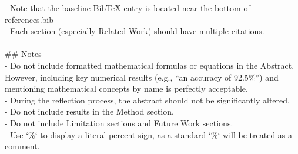\begin{tcolorbox}[colback=gray!10, colframe=gray!40!black, breakable=true, title=CLAUDE.md for the writing agent]
- Note that the baseline BibTeX entry is located near the bottom of references.bib\\
- Each section (especially Related Work) should have multiple citations.\\
\\
\#\# Notes\\
- Do not include formatted mathematical formulas or equations in the Abstract. However, including key numerical results (e.g., ``an accuracy of 92.5\%'') and mentioning mathematical concepts by name is perfectly acceptable.\\
- During the reflection process, the abstract should not be significantly altered.\\
- Do not include results in the Method section.\\
- Do not include Limitation sections and Future Work sections.\\
- Use `\%` to display a literal percent sign, as a standard `\%` will be treated as a comment.\\
\end{tcolorbox}

